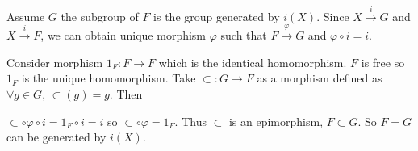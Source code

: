 \begin{answer}
    Assume $G$ the subgroup of $F$ is the group generated by $i(X)$. Since $X\xrightarrow{i}G$ and $X\xrightarrow{i}F$, we can obtain unique morphism $\varphi$ such that $F\xrightarrow{\varphi}G$ and $\varphi \circ i=i$. 
    
    Consider morphism $1_{F}:F\to F$ which is the identical homomorphism. $F$ is free so $1_{F}$ is the unique homomorphism. Take $\subset:G\to F$ as a morphism defined as $\forall g\in G$, $\subset(g)=g$. Then
    
    \begin{figure}[H]\centering
    \end{figure}
    $\subset\circ\varphi\circ i=1_{F}\circ i=i$ so $\subset\circ\varphi=1_{F}$. Thus $\subset$ is an epimorphism, $F\subset G$. So $F=G$ can be generated by $i(X)$.
\end{answer}